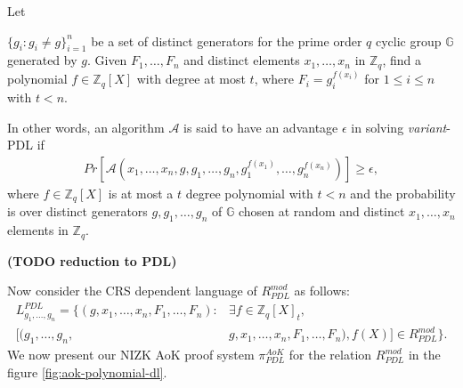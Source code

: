 \begin{definition}
  Let\par 
  $\{g_i : g_i\neq g\}_{i=1}^n$ be a set of distinct generators for the prime order $q$ cyclic 
  group $\mathbb{G}$ generated by $g$. Given $F_1,\dots,F_n$ and distinct elements $x_1,\dots,x_n$ in 
  $\mathbb{Z}_q$, find a polynomial $f\in\mathbb{Z}_q[X]$ with degree at most $t$, where 
  $F_i=g_i^{f(x_i)}$ for $1\leq i\leq n$ with $t<n$.\par

  In other words, an algorithm $\mathcal{A}$ is said to have an advantage $\epsilon$ in solving \textit{variant}-PDL if 
  \begin{align*}
    Pr[\mathcal{A}(x_1,\dots,x_n,g,g_1,\dots,g_n,g_1^{f(x_1)},\dots,g_n^{f(x_n)})]\geq\epsilon,
  \end{align*}
  where $f\in\mathbb{Z}_q[X]$ is at most a $t$ degree polynomial with $t<n$ and the probability is over 
  distinct generators $g,g_1,\dots,g_n$ of $\mathbb{G}$ chosen at random and distinct $x_1,\dots,x_n$ 
  elements in $\mathbb{Z}_q$.
\end{definition}

\textbf{(TODO reduction to PDL)}\par

Now consider the CRS dependent language of $R_{PDL}^{mod}$ as follows:
\begin{align*}
  L_{g_1,\dots,g_n}^{PDL} = \{(g,x_1,\dots,x_n,F_1,\dots,F_n) : &\exists f\in\mathbb{Z}_q[X]_t,\\ 
  [(g_1,\dots,g_n,&g,x_1,\dots,x_n,F_1,\dots,F_n),f(X)]\in R_{PDL}^{mod}\}.
\end{align*}
We now present our NIZK AoK proof system $\pi_{PDL}^{AoK}$ for the relation $R_{PDL}^{mod}$ in the 
figure \ref{fig:aok-polynomial-dl}.\par



